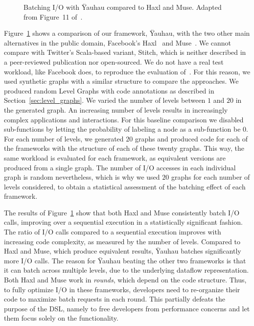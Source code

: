 \begin{figure}[t]
    	\centering
		\caption{Batching \ac{I/O} with \"{Y}auhau compared to Haxl and Muse. Adapted from Figure~11 of~\cite{ertel_cc18}.}	
		\label{fig:yauhau_baseline}
\end{figure}

Figure~\ref{fig:yauhau_baseline} shows a comparison of our framework, \"{Y}auhau, with the two other main alternatives in the public domain, Facebook's Haxl~\cite{marlow2014haxl} and Muse~\cite{muse}.
We cannot compare with Twitter's Scala-based variant, Stitch\cite{stitch}, which is neither described in a peer-reviewed publication nor open-sourced.
We do not have a real test workload, like Facebook does, to reproduce the evaluation of~\cite{marlow2014haxl}.
For this reason, we used synthetic graphs with a similar structure to compare the approaches.
We produced random Level Graphs with code annotations as described in Section~\ref{sec:level_graphs}. 
We varied the number of levels between $1$ and $20$ in the generated graph.
An increasing number of levels results in increasingly complex applications and interactions.
For this baseline comparison we disabled sub-functions by letting the probability of labeling a node as a sub-function be $0$.
For each number of levels, we generated $20$ graphs and produced code for each of the frameworks with the structure of each of these twenty graphs.
This way, the same workload is evaluated for each framework, as equivalent versions are produced from a single graph.
The number of \ac{I/O} accesses in each individual graph is random nevertheless, which is why we used $20$ graphs for each number of levels considered, to obtain a statistical assessment of the batching effect of each framework.

The results of Figure~\ref{fig:yauhau_baseline} show that both Haxl and Muse consistently batch \ac{I/O} calls, improving over a sequential execution in a statistically significant fashion.
The ratio of \ac{I/O} calls compared to a sequential execution improves with increasing code complexity, as measured by the number of levels. 
Compared to Haxl and Muse, which produce equivalent results, \"{Y}auhau batches significantly more \ac{I/O} calls.
The reason for \"{Y}auhau beating the other two frameworks is that it can batch across multiple levels, due to the underlying dataflow representation.
Both Haxl and Muse work in \emph{rounds}, which depend on the code structure.
Thus, to fully optimize \ac{I/O} in these frameworks, developers need to re-organize their code to maximize batch requests in each round.
This partially defeats the purpose of the \ac{DSL}, namely to free developers from performance concerns and let them focus solely on the functionality.

